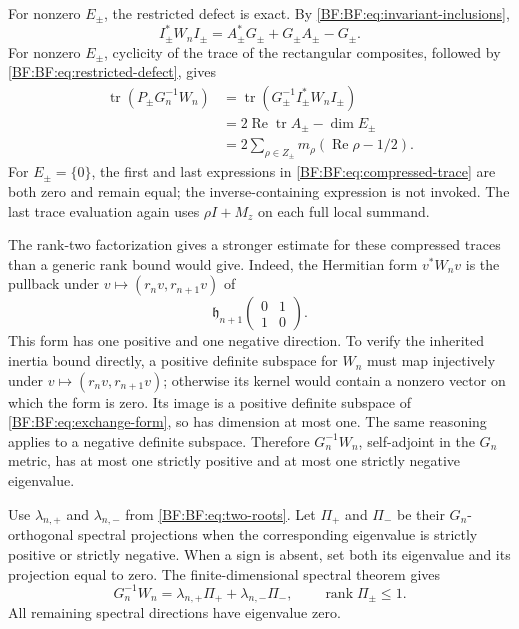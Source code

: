 For nonzero \(E_\pm\), the restricted defect is exact.
By \eqref{BF:BF:eq:invariant-inclusions},
\begin{equation}
I_\pm^*W_nI_\pm
 =A_\pm^*G_\pm+G_\pm A_\pm-G_\pm.
\tag{BF.29}\label{BF:BF:eq:restricted-defect}
\end{equation}
For nonzero \(E_\pm\), cyclicity of the trace of the rectangular
composites, followed by \eqref{BF:BF:eq:restricted-defect}, gives
\begin{equation}
\begin{split}
\operatorname{tr}(P_\pm G_n^{-1}W_n)
&=\operatorname{tr}\!\left(
  G_\pm^{-1}I_\pm^*W_nI_\pm\right)\\
&=2\operatorname{Re}\operatorname{tr}A_\pm-\dim E_\pm\\
&=2\sum_{\rho\in Z_\pm}
        m_\rho(\operatorname{Re}\rho-1/2).
\end{split}
\tag{BF.30}\label{BF:BF:eq:compressed-trace}
\end{equation}
For \(E_\pm=\{0\}\), the first and last expressions in
\eqref{BF:BF:eq:compressed-trace} are both zero and remain equal;
the inverse-containing expression is not invoked.
The last trace evaluation again uses
\(\rho I+M_z\) on each full local summand.

The rank-two factorization gives a stronger estimate for these
compressed traces than a generic rank bound would give.
Indeed, the Hermitian form \(v^*W_nv\) is the pullback under
\(v\mapsto(r_nv,r_{n+1}v)\) of
\begin{equation}
\mathfrak h_{n+1}
\begin{pmatrix}0&1\\1&0\end{pmatrix}.
\tag{BF.31}\label{BF:BF:eq:exchange-form}
\end{equation}
This form has one positive and one negative direction.
To verify the inherited inertia bound directly, a positive definite
subspace for \(W_n\) must map injectively under
\(v\mapsto(r_nv,r_{n+1}v)\); otherwise its kernel would contain
a nonzero vector on which the form is zero.
Its image is a positive definite subspace of
\eqref{BF:BF:eq:exchange-form}, so has dimension at most one.
The same reasoning applies to a negative definite subspace.
Therefore \(G_n^{-1}W_n\), self-adjoint in the \(G_n\) metric,
has at most one strictly positive and at most one strictly negative
eigenvalue.

Use \(\lambda_{n,+}\) and \(\lambda_{n,-}\) from
\eqref{BF:BF:eq:two-roots}.  Let \(\Pi_+\) and \(\Pi_-\)
be their \(G_n\)-orthogonal spectral projections when the
corresponding eigenvalue is strictly positive or strictly negative.
When a sign is absent, set both its eigenvalue and its projection
equal to zero.  The finite-dimensional spectral theorem gives
\begin{equation}
G_n^{-1}W_n
 =\lambda_{n,+}\Pi_++\lambda_{n,-}\Pi_-,
\qquad \operatorname{rank}\Pi_\pm\le1.
\tag{BF.32}\label{BF:BF:eq:spectral-projections}
\end{equation}
All remaining spectral directions have eigenvalue zero.

